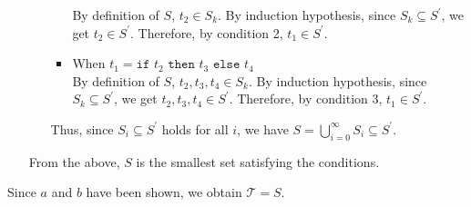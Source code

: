 \documentclass[a4paper,11pt,fleqn,dvipdfmx]{article}
\newcommand{\qed}[0]{\hfill\fbox{}}
\newcommand\Tau{\mathcal{T}}
\newcommand{\kakko}[1]{\raisebox{.2ex}{(}#1\raisebox{.2ex}{)}}
\begin{document}
\begin{itemize}
\begin{itemize}
\begin{itemize}
                            By definition of $S$, $t_2 \in S_k$. By induction hypothesis, since $S_k \subseteq S^\prime$, we get $t_2 \in S^\prime$. Therefore, by condition \kakko{2}, $t_1 \in S^\prime$.
                        \item When $t_1 = \texttt{if } t_2 \texttt{ then } t_3 \texttt{ else } t_4$ \\[2mm]
                            By definition of $S$, $t_2, t_3, t_4 \in S_k$. By induction hypothesis, since $S_k \subseteq S^\prime$, we get $t_2, t_3, t_4 \in S^\prime$. Therefore, by condition \kakko{3}, $t_1 \in S^\prime$.
                    \end{itemize}
                Thus, since $S_i \subseteq S^\prime$ holds for all $i$, we have $S = \displaystyle \bigcup_{i=0}^{\infty} S_i \subseteq S^\prime$.
            \end{itemize}
            From the above, $S$ is the smallest set satisfying the conditions.
        \end{itemize}
        Since \kakko{$a$} and \kakko{$b$} have been shown, we obtain $\Tau = S$.\qed
\end{document}
